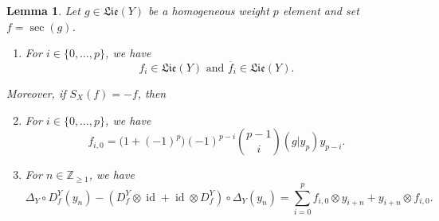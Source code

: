 \documentclass[11pt, a4paper]{amsart}
\newtheorem{lemma}[theorem]{Lemma}
\numberwithin{equation}{section}
\theoremstyle{definition}
\newcommand{\id}{\operatorname{id}}
\newcommand{\Lie}{\mathfrak{Lie}}
\begin{document}
\begin{lemma} \label{lem:coder_difference}
    Let $g\in\Lie(Y)$ be a homogeneous weight $p$ element and set $f = \sec(g)$.
    \begin{enumerate}[label=(\alph*), leftmargin=*]
        \item \label{fi_LibY} For $i \in \{0, \dots, p\}$, we have
        \[
            f_i \in \Lie(Y) \text{ and } \overline{f}_i \in \Lie(Y).
        \]
    \end{enumerate}
    Moreover, if $S_X(f) = -f$, then
    \begin{enumerate}[label=(\alph*), leftmargin=*]
        \setcounter{enumi}{1}
        \item \label{f_i0} For $i \in \{0, \dots, p\}$, we have
        \[
            f_{i,0} = \big(1+(-1)^p\big)(-1)^{p-i} \binom{p-1}{i} (g | y_p) y_{p-i}.
        \]
        \item \label{coder_difference} For $n \in \mathbb{Z}_{\geq 1}$, we have
        \[
            \Delta_Y \circ D^Y_f(y_n) - (D_f^Y \otimes \id + \id \otimes D_f^Y) \circ \Delta_Y (y_n) = \sum_{i=0}^p f_{i,0} \otimes y_{i+n} + y_{i+n} \otimes f_{i,0}. 
        \]
    \end{enumerate}
\end{lemma}
\end{document}
